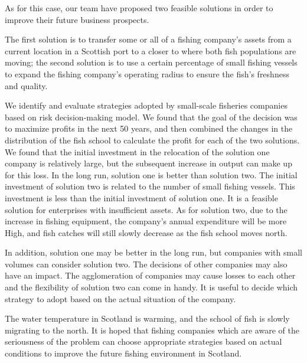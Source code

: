 \documentclass{mcmthesis}
\numberwithin{figure}{section}
\numberwithin{table}{section}
\begin{document}
As for this case, our team have proposed two feasible solutions  in order to improve their future business prospects.

The first solution is to transfer some or all of a fishing company's assets from a current location in a  Scottish port to a closer to where both fish populations are moving; the second solution is to use a certain percentage of small fishing vessels to expand the fishing company's operating radius to ensure the fish's freshness and quality. 

We identify and evaluate strategies adopted by small-scale fisheries companies based on  risk decision-making model. We found that the goal of the decision was to maximize profits in the next 50 years, and then combined the changes in the distribution of the fish school to calculate the profit for each of the two solutions. We found that the initial investment in the relocation of the solution one company is relatively large, but the subsequent increase in output can make up for this loss. In the long run, solution one is better than solution two. The initial investment of solution two is related to the number of small fishing vessels. This investment is less than the initial investment of solution one. It is a feasible solution for enterprises with insufficient assets. As for solution two, due to the increase in fishing equipment, the company's annual  expenditure will be more High, and fish catches will still slowly decrease as the fish school moves north. 

In addition, solution one may be better in the long run, but companies with small volumes can consider solution two. The decisions of other companies may also have an impact. The agglomeration of companies may cause losses to each other and the flexibility of solution two can come in handy. It is useful to decide which strategy to adopt based on the actual situation of the company.

The water temperature in Scotland is warming, and the school of fish is slowly migrating to the north. It is hoped that fishing companies which are aware of the seriousness of the problem can choose appropriate strategies based on actual conditions to improve the future fishing environment in Scotland.

\newpage
{}


\end{document}
